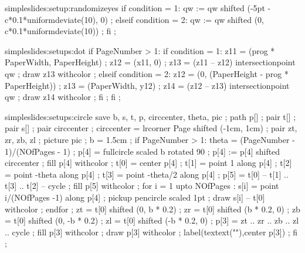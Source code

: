 



\unprotect


\startsetups simpleslides:setup:randomizeyes
if condition = 1:
  qw := qw shifted (-5pt - c*0.1*uniformdeviate(10), 0) ; 
elseif condition = 2:
  qw := qw shifted (0, c*0.1*uniformdeviate(10)) ; 
fi ;
\stopuseMPgraphic
\stopsetups

\startsetups simpleslides:setups:dot
if PageNumber > 1:
  if condition = 1:
    z11 = (prog * PaperWidth, PaperHeight) ;
    z12 = (x11, 0) ;
    z13 = (z11 -- z12) intersectionpoint qw ;
    draw z13 withcolor  ;
  elseif condition = 2:
    z12 = (0, (PaperHeight - prog * PaperHeight)) ;
    z13 = (PaperWidth, y12) ;
    z14 = (z12 -- z13) intersectionpoint qw ;
    draw z14 withcolor  ;
  fi ;
fi ;
\stopuseMPgraphic
\stopsetups

\startsetups simpleslides:setups:circle
save b, s, t, p, circcenter, theta, pic ;
path p[] ;
pair t[] ;
pair s[] ;
pair circcenter ; circcenter = lrcorner Page shifted (-1cm, 1cm) ;
pair zt, zr, zb, zl ;
picture pic ;
b = 1.5cm ;
if PageNumber > 1:
	theta = (PageNumber - 1)/(NOfPages - 1) ;
 	p[4] = fullcircle scaled b rotated 90 ;
	p[4] := p[4] shifted circcenter ;
 	fill p[4] withcolor  ;
 	t[0] = center p[4] ;
 	t[1] = point 1 along p[4] ;
 	t[2] = point -theta along p[4] ;
 	t[3] = point -theta/2 along p[4] ;
 	p[5] = t[0] -- t[1] .. t[3] .. t[2] -- cycle ;
 	fill p[5] withcolor  ;
 	for i = 1 upto NOfPages :
 		s[i] = point i/(NOfPages -1) along p[4] ;
 		pickup pencircle scaled 1pt ;
 		draw s[i] -- t[0] withcolor  ;
 	endfor ;
 	zt = t[0] shifted (0, b * 0.2) ;
	zr = t[0] shifted (b * 0.2, 0) ;
	zb = t[0] shifted (0, -b * 0.2) ;
	zl = t[0] shifted (-b * 0.2, 0) ;
	p[3] = zt .. zr .. zb .. zl .. cycle ;
 	fill p[3] withcolor   ;
 	draw p[3] withcolor  ;
 	label(textext("\switchtobodyfont[10pt]\pagenumber"),center p[3]) ;
fi ;
\stopuseMPgraphic 
\stopsetups

